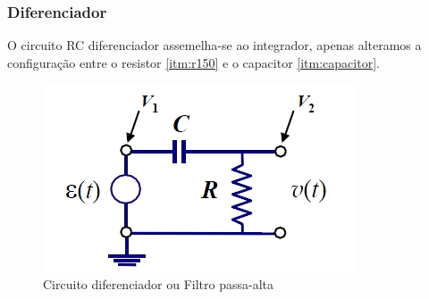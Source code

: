 \documentclass[12pt,letterpaper]{article}
\begin{document}
\subsubsection{Diferenciador}
O circuito RC diferenciador assemelha-se ao integrador, apenas alteramos a configuração entre o resistor \ref{itm:r150} e o capacitor \ref{itm:capacitor}.
\begin{figure}[!htb]
  \centering
  \label{imgint}
  \includegraphics[scale=0.5]{diferenciador.jpg}
  \caption{Circuito diferenciador ou Filtro passa-alta}
\end{figure}
\end{document}

